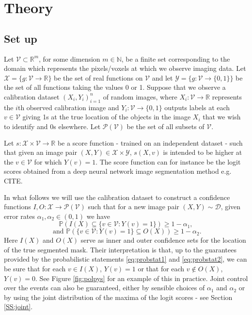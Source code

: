 \section{Theory}
\subsection{Set up}
Let $\mathcal{V} \subset \mathbb{R}^m$, for some dimension $m \in \mathbb{N}$, be a finite set corresponding to the domain which represents the pixels/voxels at which we observe imaging data. Let $\mathcal{X} = \lbrace g: \mathcal{V} \rightarrow \mathbb{R}\rbrace$ be the set of real functions on $\mathcal{V}$ and let $\mathcal{Y} = \lbrace g: \mathcal{V} \rightarrow \lbrace 0,1 \rbrace \rbrace$ be the set of all functions taking the values 0 or 1. Suppose that we observe a calibration dataset $(X_i, Y_i)_{i = 1}^n$ of random images, where $X_i: \mathcal{V} \rightarrow \mathbb{R}$ represents the $i$th observed calibration image and $Y_i:\mathcal{V} \rightarrow \lbrace 0, 1\rbrace$ outputs labels at each $v \in \mathcal{V}$ giving 1s at the true location of the objects in the image $X_i$ that we wish to identify and 0s elsewhere. Let $\mathcal{P}(\mathcal{V})$ be the set of all subsets of $\mathcal{V}$.

Let $s:\mathcal{X} \times \mathcal{V} \rightarrow \mathbb{R}$ be a score function - trained on an independent dataset - such that given an image pair $(X,Y) \in \mathcal{X}\times \mathcal{Y}$, $s(X, v)$ is intended to be higher at the $v \in \mathcal{V}$ for which $Y(v) = 1$. The score function can for instance be the logit scores obtained from a deep neural network image segmentation method e.g. CITE. 

In what follows we will use the calibration dataset to construct a confidence functions $I,O:  \mathcal{X}  \rightarrow \mathcal{P}(\mathcal{V})$ such that for a new image pair $(X,Y) \sim \mathcal{D}$, given error rates $\alpha_1, \alpha_2 \in (0,1)$ we have
\begin{equation}\label{eq:probstat1}
	\mathbb{P}\left( I(X) \subseteq \lbrace v\in \mathcal{V}: Y(v) = 1 \rbrace  \right) \geq 1 - \alpha_1, 
\end{equation}
\begin{equation}\label{eq:probstat2}
	\text{ and } 	\mathbb{P}\left( \lbrace v\in \mathcal{V}: Y(v) = 1 \rbrace \subseteq O(X)  \right) \geq 1 - \alpha_2.
\end{equation}
Here $I(X)$ and $O(X)$ serve as inner and outer confidence sets for the location of the true segmented mask. Their interpretation is that, up to the guarantees provided by the probabilistic statements \eqref{eq:probstat1} and \eqref{eq:probstat2}, we can be sure that for each $v\in I(X)$, $Y(v) = 1$ or that for each $v \not\in O(X)$, $Y(v) = 0$. See Figure \ref{fig:polpys} for an example of this in practice. Joint control over the events can also be guaranteed, either by sensible choices of $\alpha_1$ and $\alpha_2$ or by using the joint distribution of the maxima of the logit scores - see Section \ref{SS:joint}. 


